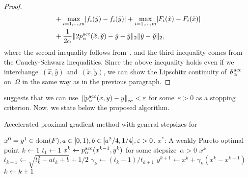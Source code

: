 \documentclass[../main]{subfiles}
\begin{document}
\begin{proof}
\begin{align}
              & + \max_{i = 1, \dots, m} \abs{f_i(\hat{y}) - f_i(\check{y})} + \max_{i = 1, \dots, m} \abs{F_i(\hat{x}) - F_i(\check{x})}                                                                                                                           \\
              & + \frac{1}{2 \alpha} \norm{2 p^\acc_\alpha(\check{x}, \check{y}) - \hat{y} - \check{y}}_2 \norm{\hat{y} - \check{y}}_2
        ,\end{align}
    where the second inequality follows from~, and the third inequality comes from the Cauchy-Schwarz inequalities.
    Since the above inequality holds even if we interchange~$(\hat{x}, \hat{y})$ and~$(\check{x}, \check{y})$, we can show the Lipschitz continuity of~$\theta^\acc_\alpha$ on~$\Omega$ in the same way as in the previous paragraph.
\end{proof}
 suggests that we can use~$\norm*{p^\acc_\alpha(x, y) - y}_\infty < \varepsilon$ for some~$\varepsilon > 0$ as a stopping criterion.
Now, we state below the proposed algorithm.

\begin{algorithm}[hbtp]
    \caption{Accelerated proximal gradient method with general stepsizes for~}
    \begin{algorithmic}[1]
        \Require $x^0 = y^1 \in \dom(F), a \in [0, 1), b \in [a^2 / 4, 1 / 4], \varepsilon > 0$.
        \Ensure $x^\ast$: A weakly Pareto optimal point
        \State $k \gets 1$
        \State $t_1 \gets 1$ 
        \Loop
        \State $x^k \gets p^\acc_\alpha(x^{k - 1}, y^k)$ for some stepsize~$\alpha > 0$
        \State \Return $x^k$
        \EndIf
        \State $t_{k + 1} \gets \sqrt{t_k^2 - a t_k + b} + 1/2$ 
        \State $\gamma_k \gets (t_k - 1) / t_{k + 1}$ 
        \State $y^{k + 1} \gets x^k + \gamma_k (x^k - x^{k - 1})$ 
        \State $k \gets k + 1$
        \EndLoop
    \end{algorithmic}
\end{algorithm}
\end{document}
